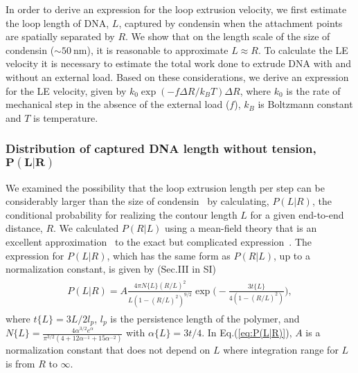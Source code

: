 \documentclass[fleqn,10pt]{wlscirep}
\newcommand{\nm}{\ \mathrm{nm}}
\newcommand{\vR}{R}
\newcommand{\vL}{L}
\newcommand{\DR}{\Delta {R}}
\begin{document}
In order to derive an expression for the loop extrusion velocity, we first estimate the loop length of DNA, $\vL$, captured by condensin when the attachment points are spatially separated by $\vR$. 
We show that on the length scale of the size of condensin ($\sim 50\nm$), it is reasonable to approximate $\vL \approx \vR $. To calculate the LE velocity it is necessary to estimate the total work done to extrude DNA with and without an external load. Based on these considerations, we derive an expression for the LE velocity, given by $k_0 \exp({-f\DR/k_BT})\DR$, where $k_0$ is the rate of mechanical step in the absence of the external load ($f$), $k_B$ is Boltzmann constant and $T$ is temperature.

\subsubsection*{Distribution of captured DNA length without tension, $\boldsymbol{P(\vL|\vR)}$ }
We examined the possibility that the loop extrusion length per step can be considerably larger than the size of condensin~\cite{terakawa2017condensin,lawrimore2017rotostep,ganji2018real,diebold2017structure} by calculating, $P(\vL|\vR)$, the conditional probability for realizing the contour length $\vL$ for a given end-to-end distance, $\vR$.  We calculated $P(\vR|\vL)$ using a mean-field theory that is an excellent approximation~\cite{hyeon2006kinetics} to the exact but complicated expression~\cite{wilhelm1996radial}.  The expression for $P(\vL|\vR)$, which has the same form as $P(\vR|\vL)$, up to a normalization constant, is given by (Sec.III in SI) %
\begin{align} 
\begin{split}
\label{eq:P(L|R)}
P(\vL|\vR) = A \frac{4\pi N\{\vL \} (\vR/\vL)^2}{\vL(1-(\vR/\vL)^2)^{9/2}} \exp\Big(-\frac{3t\{\vL\}}{4(1-(\vR/\vL)^2)}\Big),
\end{split} 
\end{align}
where $t\{\vL\}=3\vL/2l_p$, $l_p$ is the persistence length of the polymer, and  $N\{\vL\}=\frac{4\alpha^{3/2}e^{\alpha}}{\pi^{3/2}(4+12\alpha^{-1}+15\alpha^{-2})}$ with $\alpha\{\vL\}=3t/4$. In Eq.(\ref{eq:P(L|R)}), $A$ is a normalization constant that does not depend on $\vL$ where integration range for $\vL$ is from $\vR$ to $\infty$. 
\end{document}
